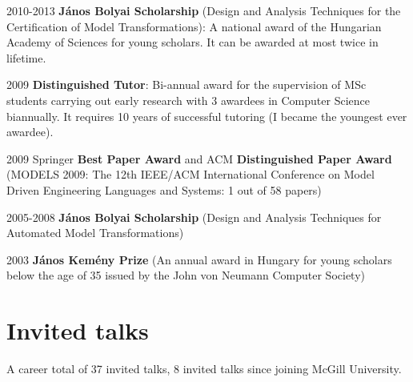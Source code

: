 \begin{yearlist}
\item[2010-2013] \textbf{J\'anos Bolyai Scholarship} (Design and Analysis Techniques for the Certification of Model Transformations): A national award of the Hungarian Academy of Sciences for young scholars. It can be awarded
at most twice in lifetime.
\item[2009] \textbf{Distinguished Tutor}: Bi-annual award for the supervision of MSc students carrying out early research with 3 awardees in Computer Science biannually. It requires 10 years of successful tutoring (I became the youngest ever awardee). 
\item[2009] Springer \textbf{Best Paper Award} and ACM \textbf{Distinguished Paper Award} (MODELS
2009: The 12th IEEE/ACM International Conference on Model Driven Engineering Languages and Systems: 1 out of 58 papers) 
\item[2005-2008] \textbf{J\'anos Bolyai Scholarship} (Design and Analysis Techniques for Automated Model Transformations) 
\item[2003] \textbf{J\'anos Kem\'eny Prize } (An annual award in Hungary for young scholars below the age of 35 issued by the John von Neumann Computer Society)
\end{yearlist}

\section{Invited talks}

A career total of 37 invited talks, 8 invited talks since joining McGill University. 

